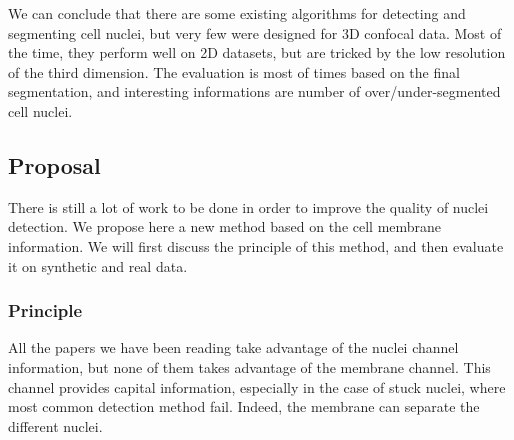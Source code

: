 We can conclude that there are some existing algorithms for detecting and segmenting cell nuclei,
but very few were designed for 3D confocal data.
Most of the time, they perform well on 2D datasets, but are tricked by the low resolution of the third dimension.
The evaluation is most of times based on the final segmentation, and interesting informations are number of over/under-segmented cell nuclei.



\subsection{Proposal}
\label{sect:proposal}
There is still a lot of work to be done in order to improve the quality of nuclei detection. We propose here a new method based on the cell membrane information. We will first discuss the principle of this method, and then evaluate it on synthetic and real data.

\subsubsection{Principle}

All the papers we have been reading take advantage of the nuclei channel information, but none of them takes advantage of the membrane channel.
This channel provides capital information, especially in the case of stuck nuclei, where most common detection method fail.
Indeed, the membrane can separate the different nuclei.

\paragraph*{}

